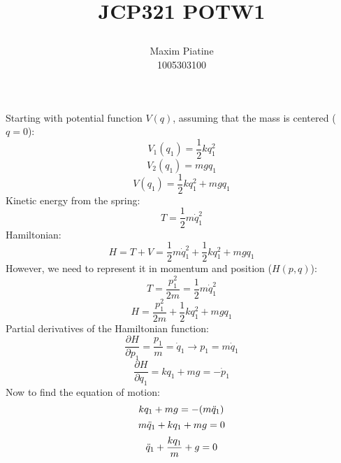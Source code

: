 \documentclass[11pt]{article}
\title{\textbf{JCP321 POTW1}
\author{Maxim Piatine\\1005303100}}
\date{}
\begin{document}
\maketitle
\begin{center}
\end{center}
\vspace{5mm}
Starting with potential function $V(q)$, assuming that the mass is centered ($q=0$):
\[V_1(q_1)=\frac{1}{2}kq_1^2\] 
\[V_2(q_1)=mgq_1\]
\[V(q_1)=\frac{1}{2}kq_1^2+mgq_1\]
Kinetic energy from the spring:
\[T=\frac{1}{2}m\dot{q}_1^2\]
Hamiltonian:
\[H=T+V=\frac{1}{2}m\dot{q}_1^2+\frac{1}{2}kq_1^2+mgq_1\]
However, we need to represent it in momentum and position ($H(p,q)$):
\[T=\frac{p_1^2}{2m}=\frac{1}{2}m\dot{q}^2_1\]
\[H=\frac{p_1^2}{2m}+\frac{1}{2}kq_1^2+mgq_1\]
\newpage
Partial derivatives of the Hamiltonian function:
\[\frac{\partial H}{\partial p_1}=\frac{p_1}{m}=\dot{q}_1 \rightarrow p_1=m\dot{q}_1\]
\[\frac{\partial H}{\partial q_1}=kq_1+mg=-\dot{p}_1\]
Now to find the equation of motion:
\[kq_1+mg=-(m\Ddot{q}_1)\]
\[m\Ddot{q}_1+kq_1+mg=0\]
\[\Ddot{q}_1+\frac{kq_1}{m}+g=0\]
\end{document}
